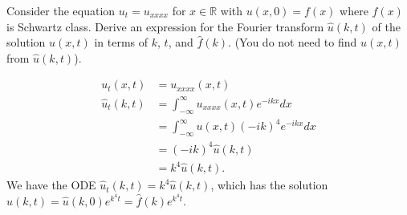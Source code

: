 \documentclass[plain]{pset}
\begin{document}
\begin{problem}
Consider the equation \(u_t = u_{xxxx}\) for \(x \in \mathbb{R}\) with \(u(x,0) = f(x)\) where \(f(x)\) is Schwartz class. Derive an expression for the Fourier transform \(\hat{u}(k, t)\) of the solution \(u(x, t)\) in terms of \(k\), \(t\), and \(\hat{f}(k)\). (You do not need to find \(u(x, t)\) from \(\hat{u}(k, t)\)).
\end{problem}
\begin{solution}
    \begin{align*}
        u_t(x, t)       & = u_{xxxx}(x, t)                                     \\
        \hat{u}_t(k, t) & = \int_{-\infty}^{\infty} u_{xxxx}(x, t)e^{-ikx}dx   \\
                        & = \int_{-\infty}^{\infty} u(x, t){(-ik)}^4e^{-ikx}dx \\
                        & = {(-ik)}^4\hat{u}(k, t)                             \\
                        & = k^4\hat{u}(k, t).
    \end{align*}
    We have the ODE \(\hat{u}_t(k, t) = k^4\hat{u}(k, t)\), which has the solution \(\hat{u}(k, t) = \hat{u}(k, 0)e^{k^4t} = \hat{f}(k)e^{k^4t}\).

\end{solution}

\pagebreak
\end{document}
